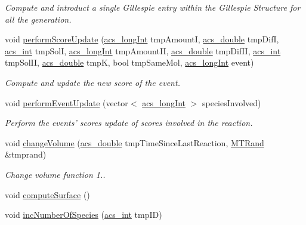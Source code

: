 \begin{DoxyCompactItemize}
\begin{DoxyCompactList}\small\item\em Compute and introduct a single Gillespie entry within the Gillespie Structure for all the generation. \end{DoxyCompactList}\item 
void \hyperlink{a00003_ad25f6aa3ab2ac6097f57828bcf78e5c9}{perform\-Score\-Update} (\hyperlink{a00016_a19319d75f02db4308bc5c0026d98cd85}{acs\-\_\-long\-Int} tmp\-Amount\-I, \hyperlink{a00016_ab776853a005fcbf56af0424a2a4dd607}{acs\-\_\-double} tmp\-Dif\-I, \hyperlink{a00016_a8d277355641a098190360234e2ebde35}{acs\-\_\-int} tmp\-Sol\-I, \hyperlink{a00016_a19319d75f02db4308bc5c0026d98cd85}{acs\-\_\-long\-Int} tmp\-Amount\-I\-I, \hyperlink{a00016_ab776853a005fcbf56af0424a2a4dd607}{acs\-\_\-double} tmp\-Dif\-I\-I, \hyperlink{a00016_a8d277355641a098190360234e2ebde35}{acs\-\_\-int} tmp\-Sol\-I\-I, \hyperlink{a00016_ab776853a005fcbf56af0424a2a4dd607}{acs\-\_\-double} tmp\-K, bool tmp\-Same\-Mol, \hyperlink{a00016_a19319d75f02db4308bc5c0026d98cd85}{acs\-\_\-long\-Int} event)
\begin{DoxyCompactList}\small\item\em Compute and update the new score of the event. \end{DoxyCompactList}\item 
void \hyperlink{a00003_ae7ef2ef3277e15e1644496e118ebb9bc}{perform\-Event\-Update} (vector$<$ \hyperlink{a00016_a19319d75f02db4308bc5c0026d98cd85}{acs\-\_\-long\-Int} $>$ species\-Involved)
\begin{DoxyCompactList}\small\item\em Perform the events' scores update of scores involved in the reaction. \end{DoxyCompactList}\item 
void \hyperlink{a00003_a4dfd9bff19e6026f3b4b35af5cedac9a}{change\-Volume} (\hyperlink{a00016_ab776853a005fcbf56af0424a2a4dd607}{acs\-\_\-double} tmp\-Time\-Since\-Last\-Reaction, \hyperlink{a00008}{M\-T\-Rand} \&tmprand)
\begin{DoxyCompactList}\small\item\em Change volume function  1.. \end{DoxyCompactList}\item 
void \hyperlink{a00003_a4526a2b544fe9dc2d174d2699bead876}{compute\-Surface} ()
\item 
void \hyperlink{a00003_a9fdf3a3b16809edd87c1b1963ef0a67f}{inc\-Number\-Of\-Species} (\hyperlink{a00016_a8d277355641a098190360234e2ebde35}{acs\-\_\-int} tmp\-I\-D)

\end{DoxyCompactItemize}
